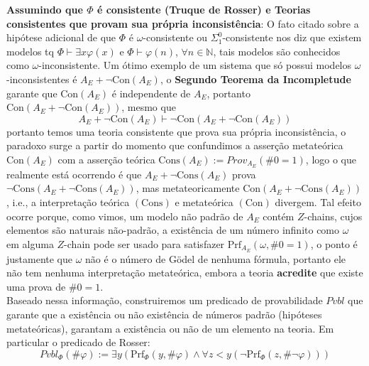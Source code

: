 \documentclass[11pt]{article}
\newcommand{\mbb}[1]{\mathbb{#1}}
\begin{document}
\begin{shaded}
\textbf{Assumindo que $\Phi$ é consistente (Truque de Rosser) e Teorias consistentes que provam sua própria inconsistência}: O fato citado sobre a hipótese adicional de que $\Phi$ é $\omega$-consistente ou $\Sigma_1^0$-consistente nos diz que existem modelos tq $\Phi\vdash\exists x\varphi(x)$ e $\Phi\vdash\varphi(n)$, $\forall n\in\mbb{N}$, tais modelos são conhecidos como $\omega$-inconsistente. Um ótimo exemplo de um sistema que só possui modelos $\omega$-inconsistentes é $A_E+\neg\text{Con}(A_E)$, o \textbf{Segundo Teorema da Incompletude} garante que $\text{Con}(A_E)$ é independente de $A_E$, portanto $\text{Con}(A_E+\neg\text{Con}(A_E))$, mesmo que
$$A_E+\neg\text{Con}(A_E)\vdash\neg\text{Con}(A_E+\neg\text{Con}(A_E))$$
portanto temos uma teoria consistente que prova sua própria inconsistência, o paradoxo surge a partir do momento que confundimos a asserção metateórica $\text{Con}(A_E)$ com a asserção teórica $\text{Cons}(A_E):=Prov_{A_E}(\#0=1)$, logo o que realmente está ocorrendo é que $A_E+\neg\text{Cons}(A_E)$ prova $\neg\text{Cons}(A_E+\neg\text{Cons}(A_E))$, mas metateoricamente $\text{Con}(A_E+\neg\text{Cons}(A_E))$, i.e., a interpretação teórica $(\text{Cons})$ e metateórica $(\text{Con})$ divergem. Tal efeito ocorre porque, como vimos, um modelo não padrão de $A_E$ contém $Z$-chains, cujos elementos são naturais não-padrão, a existência de um número infinito como $\omega$ em alguma $Z$-chain pode ser usado para satisfazer $\text{Prf}_{A_E}(\omega,\#0=1)$, o ponto é justamente que $\omega$ não é o número de Gödel de nenhuma fórmula, portanto ele não tem nenhuma interpretação metateórica, embora a teoria \textbf{acredite} que existe uma prova de $\#0=1$.\\
Baseado nessa informação, construiremos um predicado de provabilidade $Pvbl$ que garante que a existência ou não existência de números padrão (hipóteses metateóricas), garantam a existência ou não de um elemento na teoria. Em particular o predicado de Rosser:
$$Pvbl_\Phi(\#\varphi):=\exists y(\text{Prf}_\Phi(y,\#\varphi)\wedge\forall z<y(\neg\text{Prf}_\Phi(z,\#\neg\varphi)))$$

\end{shaded}
\end{document}

